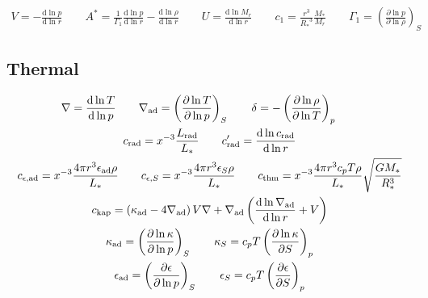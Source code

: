 \documentclass[fleqn]{article}
\newcommand{\diff}{\ensuremath{\mathrm{d}}}
\newcommand{\As}{\ensuremath{A^{\ast}}}
\newcommand{\nabad}{\ensuremath{\nabla_{\rm ad}}}
\newcommand{\kapad}{\ensuremath{\kappa_{\rm ad}}}
\newcommand{\kapS}{\ensuremath{\kappa_{S}}}
\newcommand{\epsad}{\ensuremath{\epsilon_{\rm ad}}}
\newcommand{\epsS}{\ensuremath{\epsilon_{S}}}
\newcommand{\crad}{\ensuremath{c_{\rm rad}}}
\newcommand{\cepsad}{\ensuremath{c_{\epsilon,{\rm ad}}}}
\newcommand{\cepsS}{\ensuremath{c_{\epsilon,S}}}
\newcommand{\cthm}{\ensuremath{c_{\rm thm}}}
\newcommand{\ckap}{\ensuremath{c_{\rm kap}}}
\newcommand{\Rstar}{\ensuremath{R_{\ast}}}
\newcommand{\Mstar}{\ensuremath{M_{\ast}}}
\newcommand{\Lrad}{\ensuremath{L_{\rm rad}}}
\newcommand{\Lstar}{\ensuremath{L_{\ast}}}
\begin{document}
\begin{gather*}
V = -\frac{\diff \ln p}{\diff \ln r} \qquad
\As = \frac{1}{\Gamma_{1}} \frac{\diff \ln p}{\diff \ln r} - \frac{\diff \ln \rho}{\diff \ln r} \qquad
U = \frac{\diff \ln M_{r}}{\diff \ln r} \qquad
c_1 = \frac{r^{3}}{\Rstar^{3}} \frac{\Mstar}{M_{r}} \qquad
\Gamma_{1} = \left( \frac{\partial \ln p}{\partial \ln \rho} \right)_{S}
\end{gather*}

\subsection*{Thermal}

\begin{gather*}
\nabla = \frac{\diff \ln T}{\diff \ln p} \qquad
\nabad = \left( \frac{\partial \ln T}{\partial \ln p} \right)_{S} \qquad
\delta = - \left( \frac{\partial \ln \rho}{\partial \ln T} \right)_{p} \qquad \\
\crad = x^{-3} \frac{\Lrad}{\Lstar} \qquad
\crad' = \frac{\diff \ln \crad}{\diff \ln r} \\
\cepsad = x^{-3} \frac{4\pi r^{3} \epsad \rho}{\Lstar} \qquad
\cepsS = x^{-3} \frac{4\pi r^{3} \epsS \rho}{\Lstar} \qquad
\cthm = x^{-3} \frac{4\pi r^{3} c_{p} T \rho}{\Lstar} \sqrt{\frac{G\Mstar}{\Rstar^{3}}} \\
\ckap = \left( \kapad - 4 \nabad \right) V \nabla + \nabad \left( \frac{\diff \ln \nabad}{\diff \ln r} + V \right) \\
\kapad = \left( \frac{\partial \ln \kappa}{\partial \ln p} \right)_{S} \qquad
\kapS = c_{p} T \left( \frac{\partial \ln \kappa}{\partial S} \right)_{p} \\
\epsad = \left( \frac{\partial \epsilon}{\partial \ln p} \right)_{S} \qquad
\epsS = c_{p} T \left( \frac{\partial \epsilon}{\partial S} \right)_{p}
\end{gather*}
\end{document}
